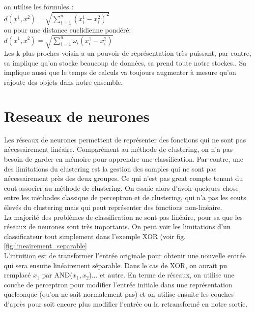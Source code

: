 \documentclass[oneside]{book}
\begin{document}
on utilise les formules : \\

\centering
$d(x^1, x^2) = \sqrt{\sum\limits_{i=1}^{n} (x_i^1 - x_i^2)^2}$\\

ou pour une distance euclidienne pondéré:\\

$d(x^1,x^2) = \sqrt{\sum\limits_{i=1}^{n} \omega_i (x_i^1 - x_i^2)}$\\

Les k plus proches voisin a un pouvoir de représentation très puissant, par contre, sa implique qu'on stocke beaucoup de données, sa prend toute notre stockes.. Sa implique aussi que le temps de calculs va toujours augmenter à mesure qu'on rajoute des objets dans notre ensemble.
\justify
\section{Reseaux de neurones}

Les réseaux de neurones permettent de représenter des fonctions qui ne sont pas nécessairement linéaire. Comparément au méthode de clustering, on n'a pas besoin de garder en mémoire pour apprendre une classification. Par contre, une des limitations du clustering est la gestion des samples qui ne sont pas nécessairement près des deux groupes. Ce qui n'est pas great compte tenant du cout associer au méthode de clustering. On essaie alors d'avoir quelques chose entre les méthodes classique de perceptron et de clustering, qui n'a pas les couts élevés du clustering mais qui peut représenter des fonctions non-linéaire.\\

La majorité des problèmes de classification ne sont pas linéaire, pour sa que les réseaux de neurones sont très importants. On peut voir les limitations d'un classificateur tout simplement dans l'exemple XOR (voir fig. \ref{fig:lineairement_separable}\\

L'intuition est de transformer l'entrée originale pour obtenir une nouvelle entrée qui sera ensuite linéairement séparable. Dans le cas de XOR, on aurait pu remplacé $x_1$ par AND($x_1,x_2$)... et autre. En terme de réseaux, on utilise une couche de perceptron pour modifier l'entrée initiale dans une représentation quelconque (qu'on ne sait normalement pas) et on utilise ensuite les couches d'après pour soit encore plus modifier l'entrée ou la retransformé en notre sortie.\\
\end{document}
